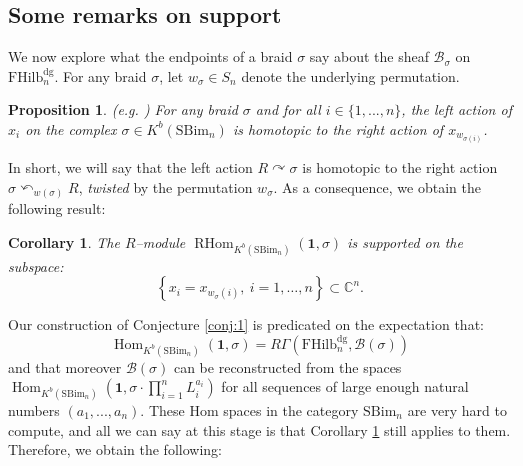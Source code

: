 \documentclass[12pt]{amsart}
\numberwithin{equation}{section}
\newtheorem{proposition}[theorem]{Proposition}
\newtheorem{corollary}[theorem]{Corollary}
\theoremstyle{definition}
\theoremstyle{remark}
\DeclareMathOperator{\Hom}{Hom}
\DeclareMathOperator{\RHom}{{RHom}}
\newcommand{\CC}{\mathbb{C}}
\newcommand{\NN}{\mathbb{N}}
\newcommand{\CB}{\mathcal{B}}
\newcommand{\CT}{\mathcal{T}}
\newcommand{\FT}{\mathbf{FT}}
\renewcommand{\1}{\mathbf{1}}
\newcommand{\FH}{\mathrm{FHilb}}
\newcommand{\SBim}{\mathrm{SBim}}
\newcommand{\dg}{\text{dg}}%
\begin{document}
\subsection{Some remarks on support}
\label{sub:knots}

We now explore what the endpoints of a braid $\sigma$ say about the sheaf $\CB_\sigma$ on $\FH_n^\dg$. For any braid $\sigma$, let $w_\sigma \in S_n$ denote the underlying permutation. 

\begin{proposition}(e.g. \cite[Proposition 2.16]{Hog})
For any braid $\sigma$ and for all $i\in \{1,...,n\}$, the left action of $x_i$ on the complex $\sigma \in K^b(\SBim_n)$ is homotopic to the right action of $x_{w_{\sigma(i)}}$.
\end{proposition}

In short, we will say that the left action $R \curvearrowright \sigma$ is homotopic to the right action $\sigma \curvearrowleft_{w(\sigma)} R$, {\em twisted} by the permutation $w_{\sigma}$. As a consequence, we obtain the following result:

\begin{corollary}
\label{cor:support rouquier}
The $R$--module $\RHom_{K^b(\SBim_n)} (\1,\sigma)$ is supported on the subspace:
$$
\left\{x_i=x_{w_{\sigma}(i)},\ i=1,\ldots,n\right\}\subset \CC^n.
$$
\end{corollary}

Our construction of Conjecture \ref{conj:1} is predicated on the expectation that: 
$$
\Hom_{K^b(\SBim_n)}(\1,\sigma) = R\Gamma(\FH_n^\dg,\CB(\sigma))
$$
and that moreover $\CB(\sigma)$ can be reconstructed from the spaces $\Hom_{K^b(\SBim_n)}(\1,\sigma \cdot \prod_{i=1}^n L_i^{a_i})$ for all sequences of large enough natural numbers $(a_1,...,a_n)$. These Hom spaces in the category $\SBim_n$ are very hard to compute, and all we can say at this stage is that Corollary \ref{cor:support rouquier} still applies to them. Therefore, we obtain the following:


\end{document}
